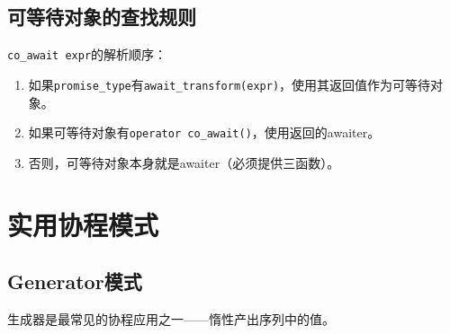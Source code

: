 \documentclass[12pt,a4paper,fontset=fandol]{ctexbook}
\begin{document}
\section{可等待对象的查找规则}

\texttt{co\_await expr}的解析顺序：

\begin{enumerate}[nosep]
\item 如果\texttt{promise\_type}有\texttt{await\_transform(expr)}，使用其返回值作为可等待对象。
\item 如果可等待对象有\texttt{operator co\_await()}，使用返回的awaiter。
\item 否则，可等待对象本身就是awaiter（必须提供三函数）。
\end{enumerate}

\chapter{实用协程模式}

\section{Generator模式}

生成器是最常见的协程应用之一——惰性产出序列中的值。
\end{document}
